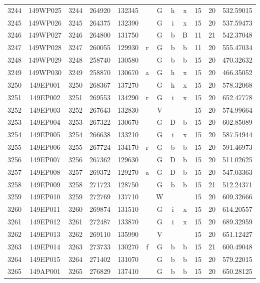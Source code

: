 \begin{tabular}{|*{12}{c|}}
3244 & 149WP025 & 3244 & 264920 & 132345 &  & G & h & x & 15 & 20 & 532.59015 \\ 
3245 & 149WP026 & 3245 & 264375 & 132390 &  & G & i & x & 15 & 20 & 537.59473 \\ 
3246 & 149WP027 & 3246 & 264800 & 131750 &  & G & b & B & 11 & 21 & 542.37048 \\ 
3247 & 149WP028 & 3247 & 260055 & 129930 & r & G & b & b & 11 & 20 & 555.47034 \\ 
3248 & 149WP029 & 3248 & 258740 & 130580 &  & G & b & b & 15 & 20 & 470.32632 \\ 
3249 & 149WP030 & 3249 & 258870 & 130670 & a & G & h & x & 15 & 20 & 466.35052 \\ 
3250 & 149EP001 & 3250 & 268367 & 137270 &  & G & h & x & 15 & 20 & 578.32068 \\ 
3251 & 149EP002 & 3251 & 269553 & 134290 & r & G & i & x & 15 & 20 & 652.47778 \\ 
3252 & 149EP003 & 3252 & 267643 & 132830 &  & V &  &  & 15 & 20 & 574.99664 \\ 
3253 & 149EP004 & 3253 & 267322 & 130670 &  & G & D & b & 15 & 20 & 602.85089 \\ 
3254 & 149EP005 & 3254 & 266638 & 133210 &  & G & i & x & 15 & 20 & 587.54944 \\ 
3255 & 149EP006 & 3255 & 267724 & 134170 & r & G & b & b & 15 & 20 & 591.46973 \\ 
3256 & 149EP007 & 3256 & 267362 & 129630 &  & G & D & b & 15 & 20 & 511.02625 \\ 
3257 & 149EP008 & 3257 & 269372 & 129270 & a & G & D & b & 15 & 20 & 547.03363 \\ 
3258 & 149EP009 & 3258 & 271723 & 128750 &  & G & b & b & 15 & 21 & 512.24371 \\ 
3259 & 149EP010 & 3259 & 272769 & 137710 &  & W &  &  & 15 & 20 & 609.32666 \\ 
3260 & 149EP011 & 3260 & 269874 & 131510 &  & G & i & x & 15 & 20 & 614.20557 \\ 
3261 & 149EP012 & 3261 & 272487 & 133870 &  & G & i & x & 15 & 20 & 689.32959 \\ 
3262 & 149EP013 & 3262 & 269110 & 135990 &  & V &  &  & 15 & 20 & 651.12427 \\ 
3263 & 149EP014 & 3263 & 273733 & 130270 & f & G & b & b & 15 & 21 & 600.49048 \\ 
3264 & 149EP015 & 3264 & 271402 & 131070 &  & G & b & b & 15 & 20 & 579.22015 \\ 
3265 & 149AP001 & 3265 & 276829 & 137410 &  & G & b & b & 15 & 20 & 650.28125 \\ 

\end{tabular}
